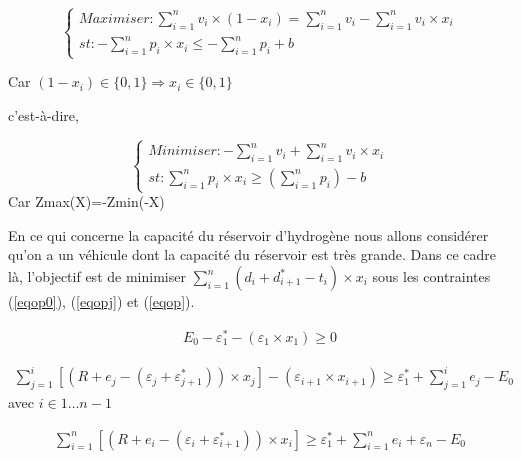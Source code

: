 $$\left\{
\begin{array}{l}

Maximiser : \sum_{i=1}^{n} v_i \times (1-x_i)=\sum_{i=1}^{n}v_i -\sum_{i=1}^{n}v_i \times x_i\\
st : -\sum_{i=1}^{n} p_i \times x_i \leq -\sum_{i=1}^{n}p_i+b
\end{array}
\right.$$

Car $(1-x_i)  \in \{0,1\} \Rightarrow x_i  \in \{0,1\}$

c'est-à-dire,

$$
\left\{
\begin{array}{l}

Minimiser :- \sum_{i=1}^{n} v_i+\sum_{i=1}^{n} v_i \times x_i  \\
st : \sum_{i=1}^{n} p_i \times x_i \geq (\sum_{i=1}^{n}p_i)-b
\end{array}
\right.$$
Car Zmax(X)=-Zmin(-X)

En ce qui concerne la capacité du réservoir d'hydrogène nous allons considérer qu'on a un véhicule dont la capacité du réservoir est très grande. Dans ce cadre là, l'objectif est de minimiser $\sum_{i=1}^{n} (d_{i}+d_{i+1}^*-t_i) \times x_i$ sous les contraintes (\ref{eqop0}), (\ref{eqopj}) et  (\ref{eqop}).

\begin{equation}
\label{eqop0}
\boxed{
\begin{array}{l}
E_0 - \varepsilon_{1}^*-(\varepsilon_{1} \times x_1)   \geq 0
\end{array}
}
\end{equation}

\begin{equation}
\label{eqopj}
\boxed{
\begin{array}{l}
\sum_{j=1}^{i}[(R + e_j- (\varepsilon_{j}+\varepsilon_{j+1}^*)) \times x_j] -(\varepsilon_{i+1} \times x_{i+1})   \geq  \varepsilon_{1}^*+ \sum_{j=1}^{i}e_j -E_0
\end{array}
}
\end{equation}
avec $i \in 1\dots n -1$

\begin{equation}
\label{eqop}
\boxed{
\begin{array}{l}
\sum_{i=1}^{n}[(R + e_{i}-(\varepsilon_{i}+\varepsilon_{i+1}^* )) \times x_i]   \geq  \varepsilon_{1}^*+ \sum_{i=1}^{n}e_i+\varepsilon_{n} -E_0
\end{array}
}
\end{equation}




